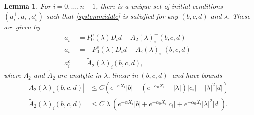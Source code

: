 \documentclass[12pt]{elsarticle}
\theoremstyle{plain}
\newtheorem{lemma}[theorem]{Lemma}
\theoremstyle{definition}
\theoremstyle{remark}
\numberwithin{theorem}{section}
\numberwithin{equation}{section}
\begin{document}
\begin{lemma}\label{Zinv1}
For $i = 0, \dots, n-1$, there is a unique set of initial conditions $(a_i^+, a_i^-, a_i^c)$ such that \cref{systemmiddle} is satisfied for any $(b, c, d)$ and $\lambda$. These are given by
\begin{equation}\label{aipmexp1}
\begin{aligned}
a_i^+ &= P_0^u(\lambda) D_i d + A_2(\lambda)_i^+(b, c, d) \\
a_i^- &= -P_0^s(\lambda) D_i d + A_2(\lambda)_i^-(b, c, d) \\
a_i^c &= \tilde{A}_2(\lambda)_i(b, c, d),
\end{aligned}
\end{equation}
where $A_2$ and $\tilde{A}_2$ are analytic in $\lambda$, linear in $(b, c, d)$, and have bounds
\begin{align}
|A_2(\lambda)_i(b, c, d)|
&\leq C \left(e^{-\alpha X_i}|b| + (e^{-\alpha_0 X_i} + |\lambda|)|c_i| + |\lambda|^2|d| \right) \label{A2bound} \\
|\tilde{A}_2(\lambda)_i(b, c, d) &\leq C |\lambda| \left( e^{-\alpha X_i} |b| + e^{-\alpha_0 X_i} |c_i| + e^{-\alpha_0 X_i} |\lambda|^2 |d| \right). \label{tildeA2bound}
\end{align}


\end{lemma}
\end{document}

